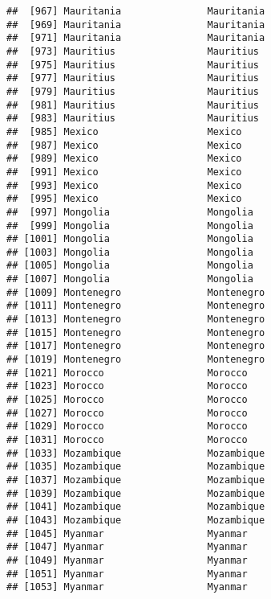 \documentclass[]{article}
\begin{document}
\begin{verbatim}
##  [967] Mauritania               Mauritania              
##  [969] Mauritania               Mauritania              
##  [971] Mauritania               Mauritania              
##  [973] Mauritius                Mauritius               
##  [975] Mauritius                Mauritius               
##  [977] Mauritius                Mauritius               
##  [979] Mauritius                Mauritius               
##  [981] Mauritius                Mauritius               
##  [983] Mauritius                Mauritius               
##  [985] Mexico                   Mexico                  
##  [987] Mexico                   Mexico                  
##  [989] Mexico                   Mexico                  
##  [991] Mexico                   Mexico                  
##  [993] Mexico                   Mexico                  
##  [995] Mexico                   Mexico                  
##  [997] Mongolia                 Mongolia                
##  [999] Mongolia                 Mongolia                
## [1001] Mongolia                 Mongolia                
## [1003] Mongolia                 Mongolia                
## [1005] Mongolia                 Mongolia                
## [1007] Mongolia                 Mongolia                
## [1009] Montenegro               Montenegro              
## [1011] Montenegro               Montenegro              
## [1013] Montenegro               Montenegro              
## [1015] Montenegro               Montenegro              
## [1017] Montenegro               Montenegro              
## [1019] Montenegro               Montenegro              
## [1021] Morocco                  Morocco                 
## [1023] Morocco                  Morocco                 
## [1025] Morocco                  Morocco                 
## [1027] Morocco                  Morocco                 
## [1029] Morocco                  Morocco                 
## [1031] Morocco                  Morocco                 
## [1033] Mozambique               Mozambique              
## [1035] Mozambique               Mozambique              
## [1037] Mozambique               Mozambique              
## [1039] Mozambique               Mozambique              
## [1041] Mozambique               Mozambique              
## [1043] Mozambique               Mozambique              
## [1045] Myanmar                  Myanmar                 
## [1047] Myanmar                  Myanmar                 
## [1049] Myanmar                  Myanmar                 
## [1051] Myanmar                  Myanmar                 
## [1053] Myanmar                  Myanmar                 

\end{verbatim}
\end{document}
